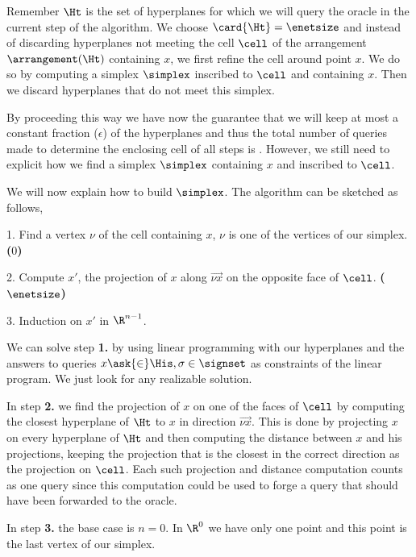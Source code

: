 Remember \(\Ht\) is the set of hyperplanes for which we will query the oracle
in the current step of the algorithm. We choose \(\card{\Ht} = \enetsize\) and
instead of discarding hyperplanes not meeting the cell $\cell$ of the
arrangement $\arrangement(\Ht)$ containing $x$, we first refine the cell around
point $x$. We do so by computing a simplex $\simplex$ inscribed to $\cell$ and
containing \(x\). Then we discard hyperplanes that do not meet this simplex.

By proceeding this way we have now the guarantee that we will keep at most a
constant fraction ($\epsilon$) of the hyperplanes and thus the total number of
queries made to determine the enclosing cell of
all steps is . However, we
still need to explicit how we find a simplex $\simplex$ containing $x$ and
inscribed to $\cell$.

We will now explain how to build $\simplex$. The algorithm can be sketched as
follows,

\begin{algorithm}
\item[1.] Find a vertex $\nu$ of the cell containing $x$, $\nu$ is one of
the vertices of our simplex. \textbf{($0$)}
\item[2.] Compute $x'$, the projection of $x$ along $\vec{\nu x}$ on the
opposite face of $\cell$. \textbf{($\enetsize$)}
\item[3.] Induction on $x'$ in $\R^{n-1}$.
\end{algorithm}

We can solve step \textbf{1.} by using linear programming with our
 hyperplanes and the
answers to queries $x \ask{\in} \His, \sigma \in \signset$ as
constraints of the linear program. We just look for any realizable solution.

In step \textbf{2.} we find the projection of $x$ on one of the faces of
$\cell$ by computing the closest hyperplane of $\Ht$ to $x$ in direction
$\vec{\nu x}$. This is done by projecting $x$ on every hyperplane of $\Ht$ and
then computing the distance between $x$ and his projections, keeping the
projection that is the closest in the correct direction as the projection
on $\cell$. Each such projection and distance computation counts as one query
since this computation could be used to forge a query that should have been
forwarded to the oracle.

In step \textbf{3.} the base case is $n = 0$. In $\R^0$ we have only one point
and this point is the last vertex of our simplex.

